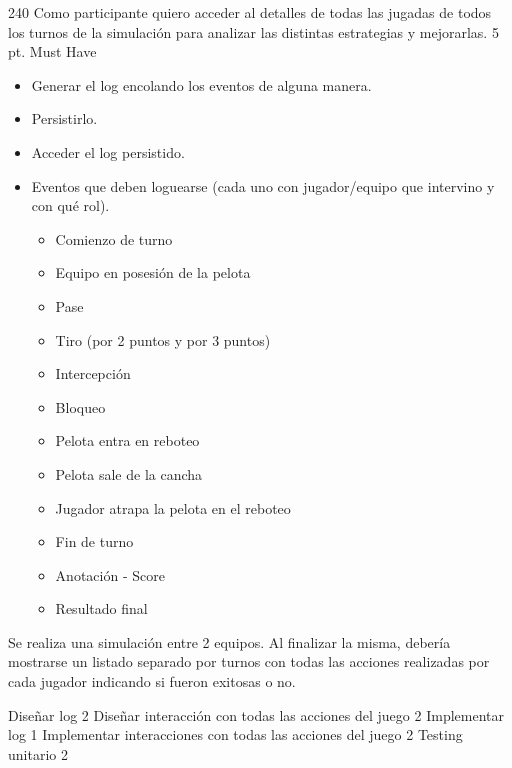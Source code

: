 
\sprintstory
{240}
{Como participante quiero acceder al detalles de todas las jugadas de todos los turnos de la simulación para analizar las distintas estrategias y mejorarlas.}
{5 pt.}
{Must Have}
{\begin{itemize}
	\item Generar el log encolando los eventos de alguna manera.
	\item Persistirlo.
	\item Acceder el log persistido.
	\item Eventos que deben loguearse (cada uno con jugador/equipo que intervino y con qué rol).
		\begin{itemize}
			\item Comienzo de turno
			\item Equipo en posesión de la pelota
			\item Pase
			\item Tiro (por 2 puntos y por 3 puntos)
			\item Intercepción
			\item Bloqueo
			\item Pelota entra en reboteo
			\item Pelota sale de la cancha
			\item Jugador atrapa la pelota en el reboteo
			\item Fin de turno
			\item Anotación - Score
			\item Resultado final
		\end{itemize}
\end{itemize}}
{Se realiza una simulación entre 2 equipos. Al finalizar la misma, debería mostrarse un listado separado por turnos con todas las acciones realizadas por cada jugador indicando si fueron exitosas o no.}

\begin{taskstable}
 \task
 {Diseñar log}
 {2}
 \task
 {Diseñar interacción con todas las acciones del juego}
 {2}
 \task
 {Implementar log}
 {1}
 \task
 {Implementar interacciones con todas las acciones del juego}
 {2}
 \task
 {Testing unitario}
 {2}
\end{taskstable}






